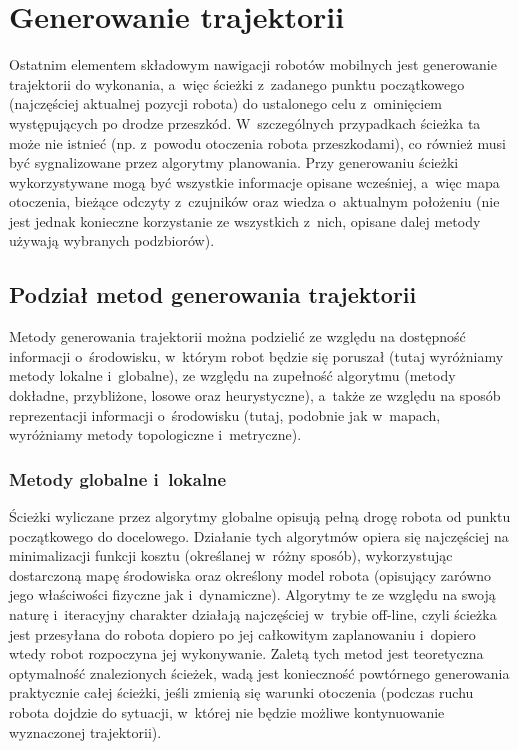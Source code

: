 \section{Generowanie trajektorii}

Ostatnim elementem składowym nawigacji robotów mobilnych jest generowanie trajektorii
do wykonania, a~więc ścieżki z~zadanego punktu początkowego (najczęściej aktualnej
pozycji robota) do ustalonego celu z~ominięciem występujących po drodze przeszkód.
W~szczególnych przypadkach ścieżka ta może nie istnieć (np. z~powodu otoczenia robota
przeszkodami), co również musi być sygnalizowane przez algorytmy planowania.
Przy generowaniu ścieżki wykorzystywane mogą być wszystkie informacje opisane wcześniej,
a~więc mapa otoczenia, bieżące odczyty z~czujników oraz wiedza o~aktualnym położeniu
(nie jest jednak konieczne korzystanie ze wszystkich z~nich, opisane dalej metody
używają wybranych podzbiorów).

\subsection{Podział metod generowania trajektorii}

Metody generowania trajektorii można podzielić ze względu na dostępność informacji
o~środowisku, w~którym robot będzie się poruszał (tutaj wyróżniamy metody lokalne
i~globalne), ze względu na zupełność algorytmu (metody dokładne, przybliżone, losowe
oraz heurystyczne), a~także ze względu na sposób reprezentacji informacji o~środowisku
(tutaj, podobnie jak w~mapach, wyróżniamy metody topologiczne i~metryczne).

\subsubsection{Metody globalne i~lokalne}

Ścieżki wyliczane przez algorytmy globalne opisują pełną drogę robota od punktu początkowego
do docelowego. Działanie tych algorytmów opiera się najczęściej na minimalizacji
funkcji kosztu (określanej w~różny sposób), wykorzystując dostarczoną mapę środowiska
oraz określony model robota (opisujący zarówno jego właściwości fizyczne jak i~dynamiczne).
Algorytmy te ze względu na swoją naturę i~iteracyjny charakter działają najczęściej
w~trybie off-line, czyli ścieżka jest przesyłana do robota dopiero po jej całkowitym
zaplanowaniu i~dopiero wtedy robot rozpoczyna jej wykonywanie. Zaletą tych metod
jest teoretyczna optymalność znalezionych ścieżek, wadą jest konieczność powtórnego generowania
praktycznie całej ścieżki, jeśli zmienią się warunki otoczenia (podczas ruchu robota
dojdzie do sytuacji, w~której nie będzie możliwe kontynuowanie wyznaczonej trajektorii).

